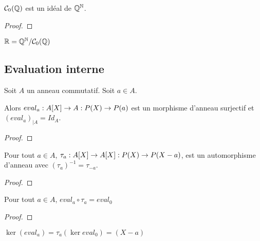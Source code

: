 \begin{proposition}
	$\mathcal{C}_{0}(\mathbb{Q})$ est un idéal de $\mathbb{Q}^{\mathbb{N}}$.
\end{proposition}

\ifdefined\outputproof
\begin{proof}

\end{proof}
\fi

\begin{definition}
	$\mathbb{R} = \mathbb{Q}^{\mathbb{N}} / \mathcal{C}_{0}(\mathbb{Q})$
\end{definition}

\subsection{Evaluation interne}

\begin{proposition}
	Soit $A$ un anneau commutatif. Soit $a \in A$.

	Alors $eval_{a} : A[X] \rightarrow A : P(X) \rightarrow P(a)$ est un
	morphisme d'anneau surjectif et ${(eval_{a})}_{|A} = Id_{A}$.
\end{proposition}

\ifdefined\outputproof
\begin{proof}

\end{proof}
\fi

\begin{proposition}
	Pour tout $a \in A$, $\tau_{a} : A[X] \rightarrow A[X] : P(X) \rightarrow
	P(X - a)$, est un automorphisme d'anneau avec $(\tau_{a})^{-1} =
	\tau_{-a}$.
\end{proposition}

\ifdefined\outputproof
\begin{proof}

\end{proof}
\fi

\begin{proposition}
	Pour tout $a \in A$, $eval_{a} \circ \tau_{a} = eval_{0}$
\end{proposition}

\ifdefined\outputproof
\begin{proof}

\end{proof}
\fi

\begin{corollary}
	$\ker(eval_{a}) = \tau_{a}(\ker{eval_{0}}) = (X - a)$
\end{corollary}

